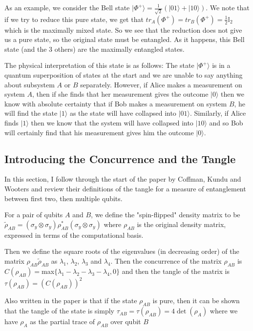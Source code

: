 \documentclass[12pt,a4paper]{article}
\numberwithin{equation}{section}
\begin{document}
As an example, we consider the Bell state $|\Phi^+\rangle = \frac{1}{\sqrt{2}}(|01\rangle + |10\rangle)$. We note that if we try to reduce this pure state, we get that $tr_{A}(\Phi^+) = tr_{B}(\Phi^+) = \frac{1}{2}\mathbb{I}_{2}$ which is the maximally mixed state. So we see that the reduction does not give us a pure state, so the original state must be entangled. As it happens, this Bell state (and the 3 others) are the maximally entangled states.

The physical interpretation of this state is as follows: The state $|\Phi^+\rangle$ is in a quantum superposition of states at the start and we are unable to say anything about subsystem $A$ or $B$ separately. However, if Alice makes a measurement on system $A$, then if she finds that her measurement gives the outcome $|0\rangle$ then we know with absolute certainty that if Bob makes a measurement on system $B$, he will find the state $|1\rangle$ as the state will have collapsed into $|01\rangle$. Similarly, if Alice finds $|1\rangle$ then we know that the system will have collapsed into $|10\rangle$ and so Bob will certainly find that his measurement gives him the outcome $|0\rangle$.



\subsection{Introducing the Concurrence and the Tangle}
\label{subsec:introducing}

In this section, I follow through the start of the paper by Coffman, Kundu and Wooters \cite{CKW} and review their definitions of the tangle for a measure of entanglement between first two, then multiple qubits.

For a pair of qubits $A$ and $B$, we define the "spin-flipped" density matrix to be $\tilde{\rho}_{AB} = (\sigma_y\otimes\sigma_y)\rho_{AB}^*(\sigma_y\otimes\sigma_y)$ where $\rho_{AB}$ is the original density matrix, expressed in terms of the computational basis.

Then we define the square roots of the eigenvalues (in decreasing order) of the matrix $\rho_{AB}\tilde{\rho}_{AB}$ as $\lambda_1$, $\lambda_2$, $\lambda_3$ and $\lambda_4$. Then the concurrence of the matrix $\rho_{AB}$ is $C(\rho_{AB}) = $max$\{\lambda_1-\lambda_2-\lambda_3-\lambda_4,0\}$ and then the tangle of the matrix is $\tau(\rho_{AB}) = (C(\rho_{AB}))^2$

Also written in the paper is that if the state $\rho_{AB}$ is pure, then it can be shown that the tangle of the state is simply $\tau_{AB} = \tau(\rho_{AB}) = 4\det(\rho_A)$ where we have $\rho_A$ as the partial trace of $\rho_{AB}$ over qubit $B$
\end{document}
